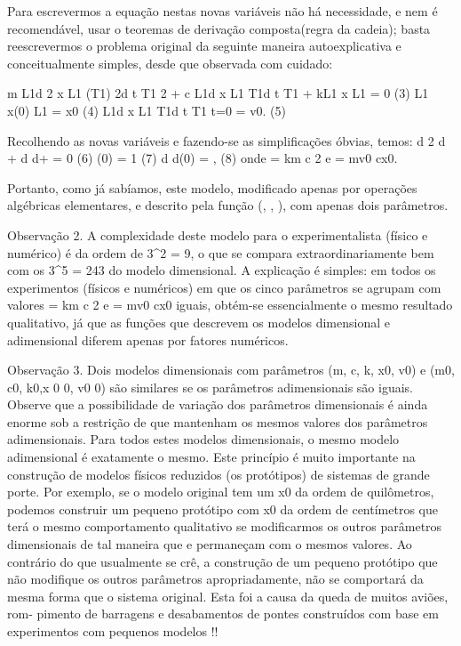 Para escrevermos a equação nestas novas variáveis não há necessidade, e nem é recomendável, usar o teoremas de derivação composta(regra da cadeia); basta reescrevermos o problema original da seguinte maneira autoexplicativa e conceitualmente simples, desde que observada com cuidado:

m
L1d
2
x
L1
(T1)
2d
t
T1
2 + c
L1d
x
L1
T1d
t
T1
 + kL1
x
L1
= 0 (3)
L1
x(0)
L1
= x0 (4)
L1d
x
L1
T1d
t
T1
t=0
= v0. (5)

Recolhendo as novas variáveis e fazendo-se as simplificações óbvias, temos:
d
2\eta
d
+
d\eta
d\tau + \eta = 0 (6)
\eta(0) = 1 (7)
d\eta
d\tau (0) = \mu , (8)
onde  =
km
c
2
e \mu =
mv0
cx0.

Portanto, como já sabíamos, este modelo, modificado apenas por operações algébricas elementares, e descrito pela função \eta(\tau, , \mu), com apenas dois parâmetros.

Observação 2. A complexidade deste modelo para o experimentalista (físico e numérico) é da ordem de 3^2 = 9, o que se compara extraordinariamente bem com os 3^5 = 243 do modelo dimensional. A explicação é simples: em todos os experimentos (físicos e
numéricos) em que os cinco parâmetros se agrupam com valores  = km
c
2
e \mu =
mv0
cx0
iguais, obtém-se essencialmente o mesmo resultado qualitativo, já que as funções que descrevem os modelos dimensional e adimensional diferem apenas por fatores numéricos.

Observação 3. Dois modelos dimensionais com parâmetros (m, c, k, x0, v0) e (m0, c0, k0,x
0
0, v0
0) são similares se os parâmetros adimensionais são iguais. Observe que a possibilidade de variação dos parâmetros dimensionais é ainda enorme sob a restrição de que mantenham os mesmos valores dos parâmetros adimensionais. Para todos estes modelos dimensionais, o mesmo modelo adimensional é exatamente o mesmo. Este princípio é muito importante na construção de modelos físicos reduzidos (os protótipos) de sistemas de grande porte. Por exemplo, se o modelo original tem um x0 da ordem de quilômetros, podemos construir um pequeno protótipo com x0 da ordem de centímetros que terá o mesmo comportamento qualitativo se modificarmos os outros parâmetros dimensionais de tal maneira que  e \mu permaneçam com o mesmos valores. Ao contrário do que usualmente se crê, a construção de um pequeno protótipo que não modifique os outros parâmetros apropriadamente, não se comportará da mesma forma que o sistema original. Esta foi a causa da queda de muitos aviões, rom-
pimento de barragens e desabamentos de pontes construídos com base em experimentos com pequenos modelos !!


